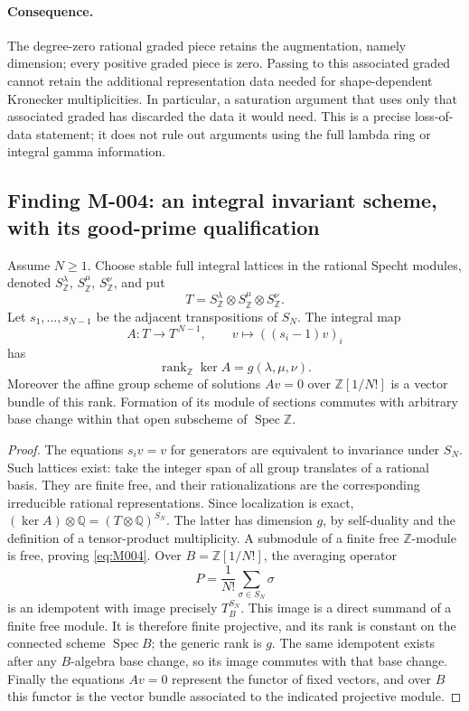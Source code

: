 \paragraph{Consequence.}
The degree-zero rational graded piece retains the augmentation,
namely dimension; every positive graded piece is zero. Passing
to this associated graded cannot retain the additional representation
data needed for shape-dependent Kronecker multiplicities. In particular, a
saturation argument that uses only that associated graded has
discarded the data it would need.  This is a precise loss-of-data
statement; it does not rule out arguments using the full lambda
ring or integral gamma information.

\subsection*{Finding M-004: an integral invariant scheme, with its good-prime qualification}
Assume \(N\geq1\). Choose stable full integral lattices in the rational Specht modules, denoted \(S^\lambda_{\mathbb Z}\),
\(S^\mu_{\mathbb Z}\), \(S^\nu_{\mathbb Z}\), and put
\[
 T=S^\lambda_{\mathbb Z}\otimes S^\mu_{\mathbb Z}
                  \otimes S^\nu_{\mathbb Z}.
\]
Let \(s_1,\ldots,s_{N-1}\) be the adjacent transpositions of \(S_N\).
The integral map
\[
 A:T\longrightarrow T^{\,N-1},\qquad
 v\longmapsto((s_i-1)v)_i
\]
has
\begin{equation}\label{eq:M004}
 \operatorname{rank}_{\mathbb Z}\ker A
       =g(\lambda,\mu,\nu).
\end{equation}
Moreover the affine group scheme of solutions \(Av=0\) over
\(\mathbb Z[1/N!]\) is a vector bundle of this rank.  Formation of
its module of sections commutes with arbitrary base change within
that open subscheme of \(\operatorname{Spec}\mathbb Z\).

\begin{proof}
The equations \(s_iv=v\) for generators are equivalent to invariance
under \(S_N\).  Such lattices exist: take the integer span of all group translates of a rational basis. They are finite free, and their rationalizations are the corresponding irreducible rational representations.  Since localization is exact,
\((\ker A)\otimes\mathbb Q=(T\otimes\mathbb Q)^{S_N}\).
The latter has dimension \(g\), by self-duality and the definition
of a tensor-product multiplicity.  A submodule of a finite free
\(\mathbb Z\)-module is free, proving \eqref{eq:M004}.
Over \(B=\mathbb Z[1/N!]\), the averaging operator
\[
 P=\frac{1}{N!}\sum_{\sigma\in S_N}\sigma
\]
is an idempotent with image precisely \(T_B^{S_N}\).
This image is a direct summand of a finite free module.  It is
therefore finite projective, and its rank is constant on the
connected scheme \(\operatorname{Spec}B\); the generic rank is \(g\).
The same idempotent exists after any \(B\)-algebra base change, so
its image commutes with that base change.  Finally the equations
\(Av=0\) represent the functor of fixed vectors, and over \(B\)
this functor is the vector bundle associated to the indicated
projective module.
\end{proof}

